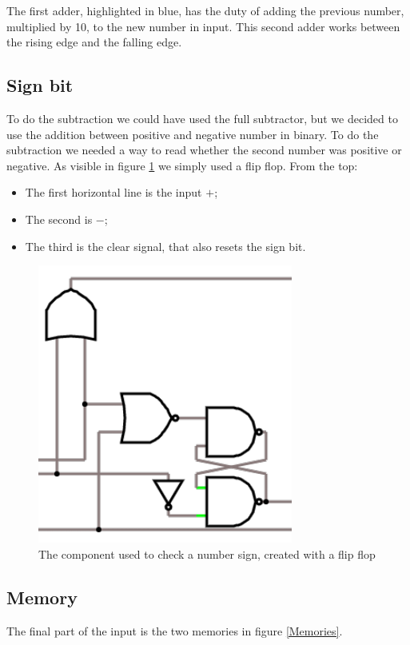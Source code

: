 \documentclass{article}
\begin{document}
The first adder, highlighted in blue, has the duty of adding the previous number, multiplied by 10, to the new number in input. This second adder works between the rising edge and the falling edge. 



\subsection{Sign bit}

To do the subtraction we could have used the full subtractor, but we decided to use the addition between positive and negative number in binary. To do the subtraction we needed a way to read whether the second number was positive or negative. As visible in figure \ref{SignBit} we simply used a flip flop. From the top:
\begin{itemize}
    \item The first horizontal line is the input $+$;
    \item The second is $-$;
    \item The third is the clear signal, that also resets the sign bit.
\end{itemize}

\begin{figure}[h]
    \centering
    \includegraphics[scale=.5]{IM_SignBit}
    \caption{The component used to check a number sign, created with a flip flop}
    \label{SignBit}
\end{figure}


\subsection{Memory}
The final part of the input is the two memories in figure \ref{Memories}.
\end{document}

